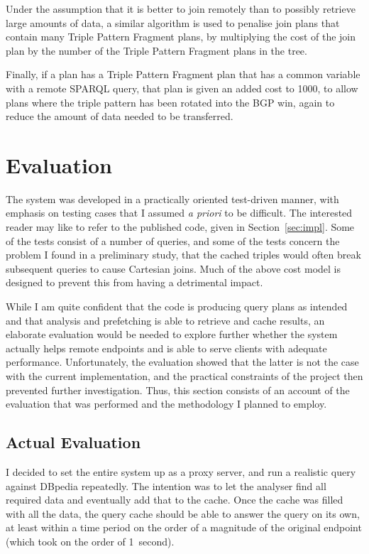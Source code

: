 Under the assumption that it is better to join remotely than to
possibly retrieve large amounts of data, a similar algorithm is used
to penalise join plans that contain many Triple Pattern Fragment
plans, by multiplying the cost of the join plan by the number of the
Triple Pattern Fragment plans in the tree.

Finally, if a plan has a Triple Pattern Fragment plan that has a
common variable with a remote SPARQL query, that plan is given an
added cost to 1000, to allow plans where the triple pattern has been
rotated into the BGP win, again to reduce the amount of data needed to
be transferred.

\section{Evaluation}

The system was developed in a practically oriented test-driven manner,
with emphasis on testing cases that I assumed \textit{a priori} to be
difficult. The interested reader may like to refer to the published code,
given in Section~\ref{sec:impl}. Some of the tests consist of a number
of queries, and some of the tests concern the problem I found in a
preliminary study, that the cached triples would often break
subsequent queries to cause Cartesian joins. Much of the above cost
model is designed to prevent this from having a detrimental impact.

While I am quite confident that the code is producing query plans as
intended and that analysis and prefetching is able to retrieve and
cache results, an elaborate evaluation would be needed to explore
further whether the system actually helps remote endpoints and is able
to serve clients with adequate performance. Unfortunately, the
evaluation showed that the latter is not the case with the current
implementation, and the practical constraints of the project then
prevented further investigation. Thus, this section consists of an
account of the evaluation that was performed and the methodology I
planned to employ.

\subsection{Actual Evaluation}

I decided to set the entire system up as a proxy server, and run a
realistic query against DBpedia repeatedly. The intention was to let
the analyser find all required data and eventually add that to the
cache. Once the cache was filled with all the data, the query cache
should be able to answer the query on its own, at least within a time
period on the order of a magnitude of the original endpoint (which
took on the order of 1~second). 

